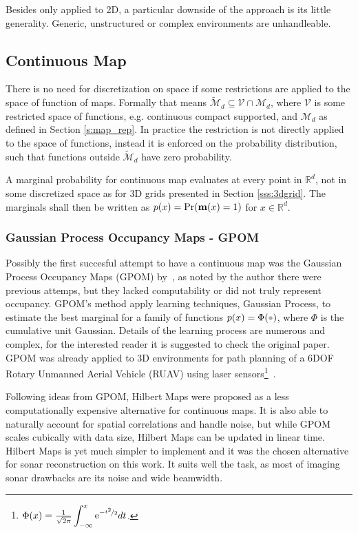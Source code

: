 Besides only applied to 2D, a particular downside of the approach is its little
generality. Generic, unstructured or complex environments are unhandleable.


\subsection{Continuous Map}

There is no need for discretization on space if some restrictions are applied to
the space of function of maps. Formally that means
$\tilde{\mathcal{M}}_d\subseteq\mathcal{V}\cap\mathcal{M}_d$, where $\mathcal{V}$
is some restricted space of functions, e.g. continuous compact supported, and
$\mathcal{M}_d$ as defined in Section \ref{s:map_rep}. In practice the
restriction is not directly applied to the space of functions, instead it is
enforced on the probability distribution, such that functions outside
$\tilde{\mathcal{M}}_d$ have zero probability.

A marginal probability for continuous map evaluates at every point in
$\mathbb{R}^d$, not in some discretized space as for 3D grids presented in
Section \ref{sss:3dgrid}. The marginals shall then be written as
$p(x)=\Pr(\mathrm{\mathbf{m}}(x)=1)$ for $x\in\mathbb{R}^d$.

\subsubsection{Gaussian
Process Occupancy Maps - GPOM}

Possibly the first succesful attempt to have a continuous map was the Gaussian
Process Occupancy Maps (GPOM) by~\citet{o2012gaussian}, as noted by the author
there were previous attemps, but they lacked computability or did not truly
represent occupancy. GPOM's method apply learning techniques, Gaussian
Process, to estimate the best marginal for a family of functions
$p(x)=\Phi(\parm)$, where $\Phi$ is the cumulative unit Gaussian. Details of the
learning process are numerous and complex, for the interested reader it is
suggested to check the original paper. GPOM was already applied to 3D
environments for path planning of a 6DOF Rotary
Unmanned Aerial Vehicle (RUAV) using laser
sensors\footnote{$\Phi(x)=\frac{1}{\sqrt{2\pi}}\displaystyle\int_{-\infty}^x
\mathrm{e}^{-\nicefrac{t^2}{2}}dt$.}~\cite{gan20093d}.

Following ideas from GPOM, Hilbert Maps were proposed as a less computationally
expensive alternative for continuous maps. It is also able to naturally account
for spatial correlations and handle noise, but while GPOM scales cubically with
data size, Hilbert Maps can be updated in linear time. Hilbert Maps is yet much
simpler to implement and it was the chosen alternative for sonar reconstruction
on this work. It suits well the task, as most of imaging sonar drawbacks are
its noise and wide beamwidth.

